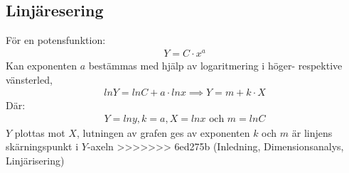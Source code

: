 \documentclass[a4paper,12pt]{article}
\begin{document}
\subsection{Linjäresering}
    För en potensfunktion:
        \begin{align}
            Y = C \cdot x^a
        \end{align}
    Kan exponenten $a$ bestämmas med hjälp av logaritmering i höger- respektive vänsterled,
        \begin{align}
            ln Y = ln C + a \cdot ln x \implies Y = m + k \cdot X
        \end{align}
    Där:
        \begin{align}
            Y = ln y, k = a, X = ln x \text{ och } m = ln C
        \end{align}
    $Y$ plottas mot $X$, lutningen av grafen ges av exponenten $k$ och $m$ är linjens skärningspunkt i $Y$-axeln
%
>>>>>>> 6ed275b (Inledning, Dimensionsanalys, Linjärisering)
\end{document}
